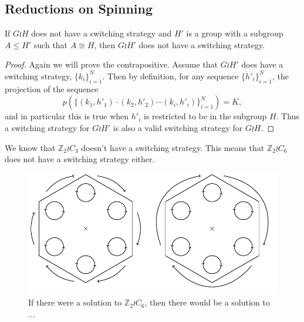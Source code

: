 \subsection{Reductions on Spinning}
\begin{theorem}
  If $G \wr H$ does not have a switching strategy and $H'$ is a group with
  a subgroup $A \leq H'$ such that $A \cong H$, then
  $G \wr H'$ does not have a switching strategy.
  \label{thm:SpinReduction}
\end{theorem}
\begin{proof}
  Again we will prove the contrapositive.
  Assume that $G \wr H'$ does have a switching strategy,
  $\{k_i\}_{i=1}^N$. Then by definition, for any sequence
  $\{h'_i\}_{i=1}^N$, the projection of the sequence \[
    p(\{(k_1, h'_1)\cdot(k_2, h'_2)\cdots(k_i, h'_i)\}_{i=1}^N) = K,
  \] and in particular this is true when $h'_i$ is restricted to be in the
  subgroup $H$. Thus a switching strategy for $G \wr H'$ is also a valid
  switching strategy for $G \wr H$.
\end{proof}

\begin{example}
  We know that $\mathbb Z_2 \wr C_3$ doesn't have a switching strategy.
  This means that $\mathbb Z_2 \wr C_6$ does not have a switching strategy either.
  \begin{figure}
    \center
    \includegraphics{assets/tikz_Z2C6.pdf}
    \caption{If there were a solution to $\mathbb Z_2 \wr C_6$, then there
    would be a solution to ...}
  \end{figure}
\end{example}


